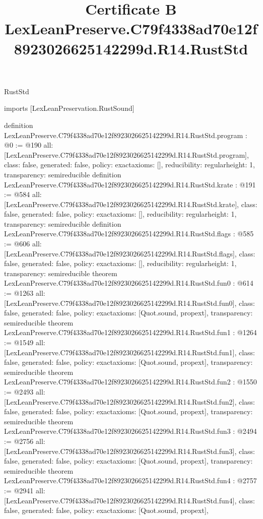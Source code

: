 \begin{lexlean}{RustStd}
\title{Certificate B LexLeanPreserve.C79f4338ad70e12f8923026625142299d.R14.RustStd}
\begin{coremodule}
imports [LexLeanPreservation.RustSound]

definition LexLeanPreserve.C79f4338ad70e12f8923026625142299d.R14.RustStd.program : @0 := @190 {
  all: [LexLeanPreserve.C79f4338ad70e12f8923026625142299d.R14.RustStd.program],
  class: false,
  generated: false,
  policy: exact{axioms: []},
  reducibility: regular{height: 1},
  transparency: semireducible
}
definition LexLeanPreserve.C79f4338ad70e12f8923026625142299d.R14.RustStd.krate : @191 := @584 {
  all: [LexLeanPreserve.C79f4338ad70e12f8923026625142299d.R14.RustStd.krate],
  class: false,
  generated: false,
  policy: exact{axioms: []},
  reducibility: regular{height: 1},
  transparency: semireducible
}
definition LexLeanPreserve.C79f4338ad70e12f8923026625142299d.R14.RustStd.flags : @585 := @606 {
  all: [LexLeanPreserve.C79f4338ad70e12f8923026625142299d.R14.RustStd.flags],
  class: false,
  generated: false,
  policy: exact{axioms: []},
  reducibility: regular{height: 1},
  transparency: semireducible
}
theorem LexLeanPreserve.C79f4338ad70e12f8923026625142299d.R14.RustStd.fun0 : @614 := @1263 {
  all: [LexLeanPreserve.C79f4338ad70e12f8923026625142299d.R14.RustStd.fun0],
  class: false,
  generated: false,
  policy: exact{axioms: [Quot.sound, propext]},
  transparency: semireducible
}
theorem LexLeanPreserve.C79f4338ad70e12f8923026625142299d.R14.RustStd.fun1 : @1264 := @1549 {
  all: [LexLeanPreserve.C79f4338ad70e12f8923026625142299d.R14.RustStd.fun1],
  class: false,
  generated: false,
  policy: exact{axioms: [Quot.sound, propext]},
  transparency: semireducible
}
theorem LexLeanPreserve.C79f4338ad70e12f8923026625142299d.R14.RustStd.fun2 : @1550 := @2493 {
  all: [LexLeanPreserve.C79f4338ad70e12f8923026625142299d.R14.RustStd.fun2],
  class: false,
  generated: false,
  policy: exact{axioms: [Quot.sound, propext]},
  transparency: semireducible
}
theorem LexLeanPreserve.C79f4338ad70e12f8923026625142299d.R14.RustStd.fun3 : @2494 := @2756 {
  all: [LexLeanPreserve.C79f4338ad70e12f8923026625142299d.R14.RustStd.fun3],
  class: false,
  generated: false,
  policy: exact{axioms: [Quot.sound, propext]},
  transparency: semireducible
}
theorem LexLeanPreserve.C79f4338ad70e12f8923026625142299d.R14.RustStd.fun4 : @2757 := @2941 {
  all: [LexLeanPreserve.C79f4338ad70e12f8923026625142299d.R14.RustStd.fun4],
  class: false,
  generated: false,
  policy: exact{axioms: [Quot.sound, propext]},
}
\end{coremodule}
\end{lexlean}
